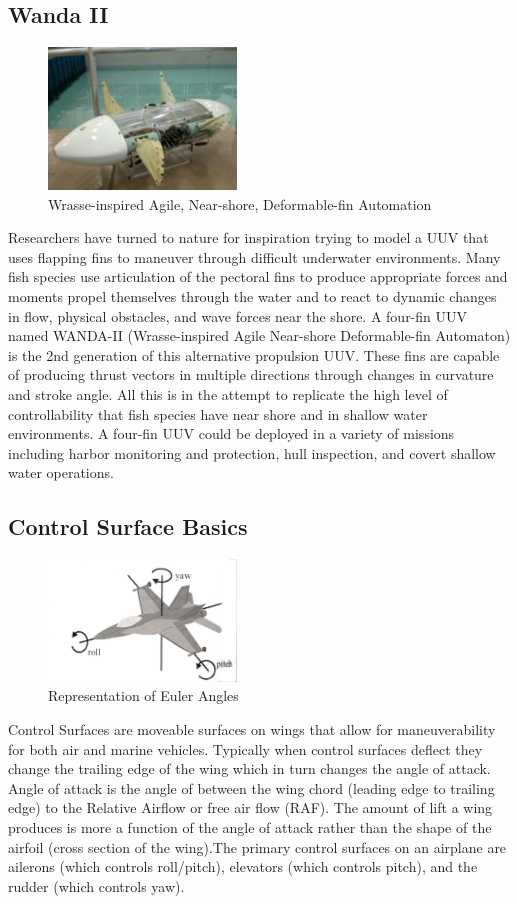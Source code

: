 \documentclass{report}
\begin{document}
\subsection{Wanda II}
\begin{figure}[h]
\centering
\includegraphics[width=5cm]{"Wanda II"}
\caption{Wrasse-inspired Agile, Near-shore, Deformable-fin Automation}
\end{figure}
Researchers have turned to nature for inspiration trying to model a UUV that uses flapping fins to maneuver through difficult underwater environments.  Many fish species use articulation of the pectoral fins to produce appropriate forces and moments propel themselves through the water and to react to dynamic changes in flow, physical obstacles, and wave forces near the shore. A four-fin UUV named WANDA-II (Wrasse-inspired Agile Near-shore Deformable-fin Automaton) is the 2nd generation of this alternative propulsion UUV. These fins are capable of producing thrust vectors in multiple directions through changes in curvature and stroke angle. All this is in the attempt to replicate the high level of controllability that fish species have near shore and in shallow water environments. A four-fin UUV could be deployed in a variety of missions including harbor monitoring and protection, hull inspection, and covert shallow water operations. 
\subsection{Control Surface Basics}
\begin{figure}[h]
\centering
\includegraphics[width=5cm]{"Pitch Roll Yaw"}
\caption{Representation of Euler Angles}
\end{figure}
Control Surfaces are moveable surfaces on wings that allow for maneuverability for both air and marine vehicles. Typically when control surfaces deflect they change the trailing edge of the wing which in turn changes the angle of attack. Angle of attack is the angle of between the wing chord (leading edge to trailing edge) to the Relative Airflow or free air flow (RAF). The amount of lift a wing produces is more a function of the angle of attack rather than the shape of the airfoil (cross section of the wing).The primary control surfaces on an airplane are ailerons (which controls roll/pitch), elevators (which controls pitch), and the rudder (which controls yaw).
\end{document}
